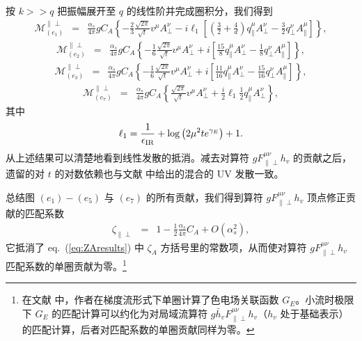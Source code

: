 按 $k >> q$ 把振幅展开至 $q$ 的线性阶并完成圈积分，我们得到
\begin{eqnarray}
\label{eq:e1pperpexpand}
\mathcal{M}_{(e_1)}^{\|\perp}
&=& \frac{\alpha_s}{4\pi}gC_A\left\{ -\frac{2}{3}\frac{\sqrt{2\pi}}{\sqrt{t}}v^{\mu}A_{\perp}^{\nu} - i \ell_1 \left[\left(\frac{3}{2} + \frac{4}{d}\right)q^{\mu}_{\|} A_{\perp}^{\nu}-\frac{3}{2}q^{\nu}_{\perp} A^{\mu}_{\|}\right]\right\},
\end{eqnarray}
\begin{eqnarray}
\label{eq:e2pperpexpand}
\mathcal{M}_{(e_2)}^{\|\perp}
&=& \frac{\alpha_s}{4\pi}gC_A\left\{ -\frac{1}{6}\frac{\sqrt{2\pi}}{\sqrt{t}}v^{\mu}A_{\perp}^{\nu} + i \left[\frac{15}{8}q^{\mu}_{\|} A_{\perp}^{\nu}-\frac{1}{8}q^{\nu}_{\perp} A^{\mu}_{\|}\right]\right\},
\end{eqnarray}
\begin{eqnarray}
\label{eq:e3pperpexpand}
\mathcal{M}_{(e_3)}^{\|\perp}
&=& \frac{\alpha_s}{4\pi}gC_A\left\{ -\frac{1}{6}\frac{\sqrt{2\pi}}{\sqrt{t}}v^{\mu}A_{\perp}^{\nu} + i \left[\frac{11}{16}q^{\mu}_{\|} A_{\perp}^{\nu}-\frac{15}{16}q^{\nu}_{\perp} A^{\mu}_{\|}\right]\right\},
\end{eqnarray}
\begin{eqnarray}
\label{eq:e7pperpexpand}
\mathcal{M}_{(e_7)}^{\|\perp}
&=& \frac{\alpha_s}{4\pi}gC_A\left\{\frac{\sqrt{2\pi}}{\sqrt{t}}v^{\mu}A_{\perp}^{\nu} + \frac{i}{2} \ell_1\frac{1}{2}q^{\mu}_{\|} A_{\perp}^{\nu}\right\},
\end{eqnarray}
其中
\begin{eqnarray}
\ell_1 = \frac{1}{\epsilon_{\rm IR}}+\log\left(2\mu^2 te^{\gamma_E}\right) +1.
\end{eqnarray}
从上述结果可以清楚地看到线性发散的抵消。减去对算符 $gF^{\mu\nu}_{\|\perp}h_v$ 的贡献之后，遗留的对 $t$ 的对数依赖也与文献 \cite{Dorn:1981wa,Zhang:2018diq,Wang:2019tgg} 中给出的混合的 UV 发散一致。

总结图 $(e_1) - (e_5)$ 与 $(e_7)$ 的所有贡献，我们得到算符 $gF^{\mu\nu}_{\|\perp}h_v$ 顶点修正贡献的匹配系数
\begin{eqnarray}
\label{eq:resultgluonvertexpperp}
\zeta_{\|\perp} &=& 1 -\frac{1}{2}\frac{\alpha_s}{4\pi}C_A+ O(\alpha_s^2),
\end{eqnarray}
它抵消了 eq.~(\ref{eq:ZAresults}) 中 $\zeta_{A}$ 方括号里的常数项，从而使对算符 $gF^{\mu\nu}_{\|\perp}h_v$ 匹配系数的单圈贡献为零。\footnote{在文献 \cite{Eller:2021qpp} 中，作者在梯度流形式下单圈计算了色电场关联函数 $G_E$。小流时极限下 $G_E$ 的匹配计算可以约化为对局域流算符 $g\bar{h}_vF^{\mu\nu}_{\|\perp}h_v$（$h_v$ 处于基础表示）的匹配计算，后者对匹配系数的单圈贡献同样为零。}


